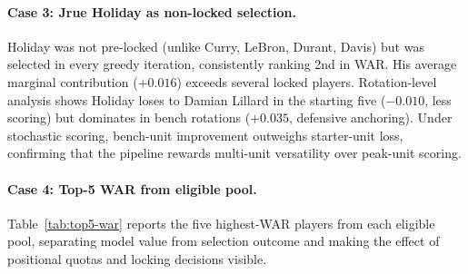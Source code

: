 \documentclass[11pt,letterpaper]{article}
\begin{document}
\paragraph{Case 3: Jrue Holiday as non-locked selection.}
Holiday was not pre-locked (unlike Curry, LeBron, Durant, Davis) but
was selected in every greedy iteration, consistently ranking 2nd in
WAR. His average marginal contribution ($+0.016$) exceeds several
locked players. Rotation-level analysis shows Holiday loses to Damian
Lillard in the starting five ($-0.010$, less scoring) but dominates in
bench rotations ($+0.035$, defensive anchoring). Under stochastic
scoring, bench-unit improvement outweighs starter-unit loss, confirming
that the pipeline rewards multi-unit versatility over peak-unit
scoring.

\paragraph{Case 4: Top-5 WAR from eligible pool.}
Table~\ref{tab:top5-war} reports the five highest-WAR players from
each eligible pool, separating model value from selection outcome and
making the effect of positional quotas and locking decisions visible.
\end{document}

